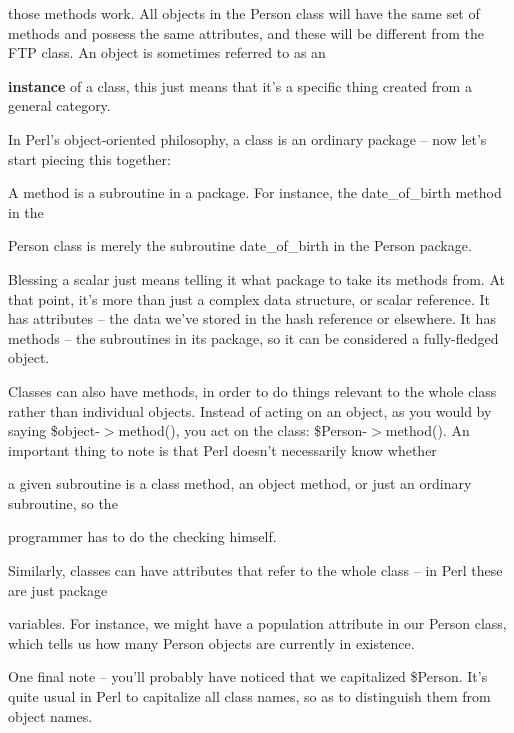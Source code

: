 \documentclass[a4paper,11pt]{book}
\begin{document}
\noindent those methods work. All objects in the Person class will have the same set of methods and possess the same attributes, and these will be different from the FTP class. An object is sometimes referred to as an

\noindent \textbf{instance }of a class, this just means that it's a specific thing created from a general category.

\noindent 

\noindent In Perl's object-oriented philosophy, a class is an ordinary package -- now let's start piecing this together:

\noindent 

  A method is a subroutine in a package. For instance, the date\_of\_birth method in the

\noindent Person class is merely the subroutine date\_of\_birth in the Person package.

\noindent 

  Blessing a scalar just means telling it what package to take its methods from. At that point, it's more than just a complex data structure, or scalar reference. It has attributes -- the data we've stored in the hash reference or elsewhere. It has methods -- the subroutines in its package, so it can be considered a fully-fledged object.

\noindent 

\noindent Classes can also have methods, in order to do things relevant to the whole class rather than individual objects. Instead of acting on an object, as you would by saying \$object-$>$method(), you act on the class: \$Person-$>$method(). An important thing to note is that Perl doesn't necessarily know whether

\noindent a given subroutine is a class method, an object method, or just an ordinary subroutine, so the

\noindent programmer has to do the checking himself.

\noindent 

\noindent Similarly, classes can have attributes that refer to the whole class -- in Perl these are just package

\noindent variables. For instance, we might have a population attribute in our Person class, which tells us how many Person objects are currently in existence.

\noindent 

\noindent One final note -- you'll probably have noticed that we capitalized \$Person. It's quite usual in Perl to capitalize all class names, so as to distinguish them from object names.
\end{document}
